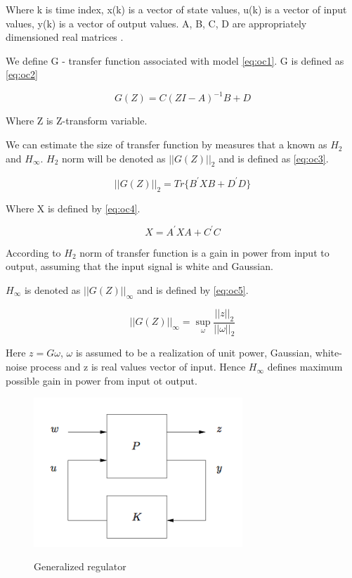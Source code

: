 \documentclass[12pt,a4paper]{report}
\begin{document}
			Where k is time index, x(k) is a vector of state values, u(k) is a vector of input values, y(k) is a vector of output values. A, B, C, D are  appropriately dimensioned real matrices \cite{hazell2008discrete}.
			
			We define G - transfer function associated with model \ref{eq:oc1}. G is defined as \ref{eq:oc2}
			
			\begin{equation}\label{eq:oc2}
				G(Z) = C(ZI - A)^{-1}B+D
			\end{equation}
			
			Where Z is Z-transform variable.
			
			We can estimate the size of transfer function by measures that a known as $H_2$ and $H_\infty$. $H_2$ norm will be denoted as $||G(Z)||_2$ and is defined as \ref{eq:oc3}.
			
			\begin{equation}\label{eq:oc3}
				||G(Z)||_2 = Tr\{ B^{'} XB + D^{'} D \}
			\end{equation}
			
			Where X is defined by \ref{eq:oc4}.
			
			\begin{equation}\label{eq:oc4}
				X = A^{'} XA + C^{'} C
			\end{equation}
			
			According to \cite{hazell2008discrete} 	$H_2$ norm of transfer function is a gain in power from input to output, assuming that the input signal is white and Gaussian.  
			
			$H_\infty$ is denoted as $||G(Z)||_\infty$ and is defined by \ref{eq:oc5}.		
			
			\begin{equation}\label{eq:oc5}
				||G(Z)||_\infty = \sup_{\omega} \dfrac{||z||_2}{||\omega||_2}
			\end{equation}
			
			Here $z = G\omega$, $\omega$ is assumed to be a realization of unit power, Gaussian, white-noise process and z is real values vector of input. Hence $H_\infty$ defines maximum possible gain in power from input ot output.
			
			\begin{figure}[h!]
				\vspace{-0.2cm}
				\centering
				{\includegraphics[width=0.7\textwidth]{11}}
				\caption{Generalized regulator \cite{hazell2008discrete}}
				\label{fig:11}
				\vspace{-0.1cm}
			\end{figure}
			
\end{document}
